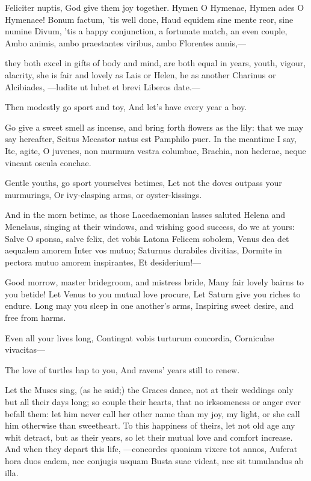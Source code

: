 {Feliciter nuptis, God give them joy together. Hymen O Hymenae,
Hymen ades O Hymenaee! Bonum factum, 'tis well done, Haud equidem sine
mente reor, sine numine Divum, 'tis a happy conjunction, a fortunate
match, an even couple,
Ambo animis, ambo praestantes viribus, ambo
Florentes annis,---

they both excel in gifts of body and mind, are both equal in years,
youth, vigour, alacrity, she is fair and lovely as Lais or Helen, he as
another Charinus or Alcibiades,
---ludite ut lubet et brevi
Liberos date.---

Then modestly go sport and toy,
And let's have every year a boy.

Go give a sweet smell as incense, and bring forth flowers as the
lily: that we may say hereafter, Scitus Mecastor natus est Pamphilo
puer. In the meantime I say,
Ite, agite, O juvenes, non murmura vestra columbae,
Brachia, non hederae, neque vincant oscula conchae.

Gentle youths, go sport yourselves betimes,
Let not the doves outpass your murmurings,
Or ivy-clasping arms, or oyster-kissings.

And in the morn betime, as those Lacedaemonian lasses saluted
Helena and Menelaus, singing at their windows, and wishing good
success, do we at yours:
Salve O sponsa, salve felix, det vobis Latona
Felicem sobolem, Venus dea det aequalem amorem
Inter vos mutuo; Saturnus durabiles divitias,
Dormite in pectora mutuo amorem inspirantes,
Et desiderium!---

Good morrow, master bridegroom, and mistress bride,
Many fair lovely bairns to you betide!
Let Venus to you mutual love procure,
Let Saturn give you riches to endure.
Long may you sleep in one another's arms,
Inspiring sweet desire, and free from harms.

Even all your lives long,
Contingat vobis turturum concordia,
Corniculae vivacitas---

The love of turtles hap to you,
And ravens' years still to renew.

Let the Muses sing, (as he said;) the Graces dance, not at their
weddings only but all their days long; so couple their hearts, that no
irksomeness or anger ever befall them: let him never call her other
name than my joy, my light, or she call him otherwise than sweetheart.
To this happiness of theirs, let not old age any whit detract, but as
their years, so let their mutual love and comfort increase. And when
they depart this life,
---concordes quoniam vixere tot annos,
Auferat hora duos eadem, nec conjugis usquam
Busta suae videat, nec sit tumulandus ab illa.

}
